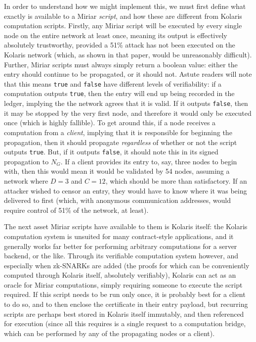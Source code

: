\documentclass{extreport}
\begin{document}
In order to understand how we might implement this, we must first define what exactly is available to a Miriar \emph{script}, and how these are different from Kolaris computation scripts. Firstly, any Miriar script will be executed by every single node on the entire network at least once, meaning its output is effectively absolutely trustworthy, provided a 51\% attack has not been executed on the Kolaris network (which, as shown in that paper, would be unreasonably difficult). Further, Miriar scripts must always simply return a boolean value: either the entry should continue to be propagated, or it should not. Astute readers will note that this means \texttt{true} and \texttt{false} have different levels of verifiability: if a computation outputs \texttt{true}, then the entry will end up being recorded in the ledger, implying the the network agrees that it is valid. If it outputs \texttt{false}, then it may be stopped by the very first node, and therefore it would only be executed once (which is highly fallible). To get around this, if a node receives a computation from a \emph{client}, implying that it is responsible for beginning the propagation, then it should propagate \emph{regardless} of whether or not the script outputs \texttt{true}. But, if it outputs \texttt{false}, it should note this in its signed propagation to \(N_G\). If a client provides its entry to, say, three nodes to begin with, then this would mean it would be validated by 54 nodes, assuming a network where \(D = 3\) and \(C = 12\), which should be more than satisfactory. If an attacker wished to censor an entry, they would have to know where it was being delivered to first (which, with anonymous communication addresses, would require control of 51\% of the network, at least).

The next asset Miriar scripts have available to them is Kolaris itself: the Kolaris computation system is unsuited for many contract-style applications, and it generally works far better for performing arbitrary computations for a server backend, or the like. Through its verifiable computation system however, and especially when zk-SNARKs are added (the proofs for which can be conveniently computed through Kolaris itself, absolutely verifiably), Kolaris can act as an oracle for Miriar computations, simply requiring someone to execute the script required. If this script needs to be run only once, it is probably best for a client to do so, and to then enclose the certificate in their entry payload, but recurring scripts are perhaps best stored in Kolaris itself immutably, and then referenced for execution (since all this requires is a single request to a computation bridge, which can be performed by any of the propagating nodes or a client).
\end{document}
